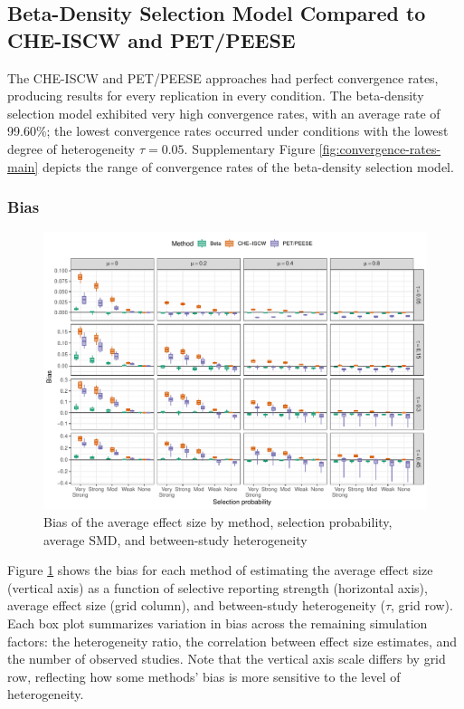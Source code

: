 \documentclass[
  man, donotrepeattitle,floatsintext]{apa7}
\begin{document}
\subsection{Beta-Density Selection Model Compared to CHE-ISCW and PET/PEESE}\label{beta-density-selection-model-compared-to-che-iscw-and-petpeese}

The CHE-ISCW and PET/PEESE approaches had perfect convergence rates, producing results for every replication in every condition. The beta-density selection model exhibited very high convergence rates, with an average rate of 99.60\%; the lowest convergence rates occurred under conditions with the lowest degree of heterogeneity \(\tau = 0.05\). Supplementary Figure \ref{fig:convergence-rates-main} depicts the range of convergence rates of the beta-density selection model.

\subsubsection{Bias}\label{bias}

\begin{figure}
\includegraphics{beta-function-selection-models-with-dependent-effects_files/figure-latex/mu-bias-main-1} \caption{Bias of the average effect size by method, selection probability, average SMD, and between-study heterogeneity}\label{fig:mu-bias-main}
\end{figure}

Figure \ref{fig:mu-bias-main} shows the bias for each method of estimating the average effect size (vertical axis) as a function of selective reporting strength (horizontal axis), average effect size (grid column), and between-study heterogeneity (\(\tau\), grid row). Each box plot summarizes variation in bias across the remaining simulation factors: the heterogeneity ratio, the correlation between effect size estimates, and the number of observed studies. Note that the vertical axis scale differs by grid row, reflecting how some methods' bias is more sensitive to the level of heterogeneity.
\end{document}
